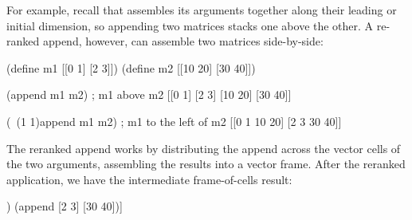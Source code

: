 For example, recall that  assembles its arguments together
along their leading or initial dimension,
so appending two matrices stacks one above the other.
A re-ranked append, however, can assemble two matrices side-by-side:
\begin{code}
    (define m1 [[0 1]
                [2 3]])
    (define m2 [[10 20]
                [30 40]])

    (append m1 m2) ; m1 above m2
[[0  1]
 [2  3]
 [10 20]
 [30 40]]

    (~(1 1)append m1 m2) ; m1 to the left of m2
[[0 1 10 20]
 [2 3 30 40]]\end{code}
The reranked append works by distributing the append across the vector
cells of the two arguments, assembling the results into a vector frame.
After the reranked application, we have the intermediate frame-of-cells result:
\begin{code}
  [(append [0 1] [10 20])
   (append [2 3] [30 40])]\end{code}


